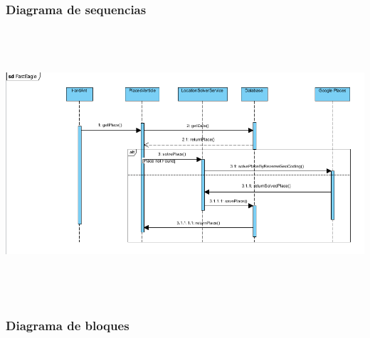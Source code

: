     \subsubsection{Diagrama de sequencias}
    \begin{center}
      \includegraphics[width=16cm,height=10cm]{./images/FastEagleSequenceDiagram}
    \end{center}
    \subsubsection{Diagrama de bloques}
